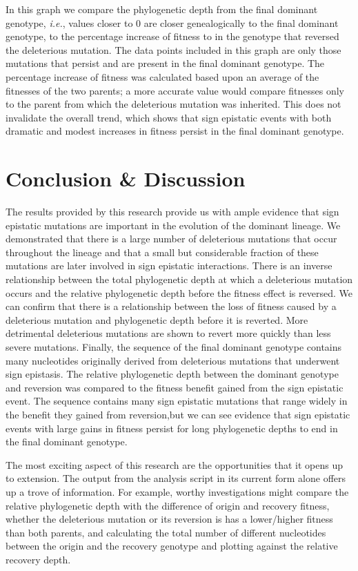 \documentclass[a4paper, 10pt]{article}
\begin{document}
In this graph we compare the phylogenetic depth from the final dominant genotype, {\em i.e.}, values closer to 0 are closer genealogically to the final dominant genotype, to the percentage increase of fitness to in the genotype that reversed the deleterious mutation. The data points included in this graph are only those mutations that persist and are present in the final dominant genotype. The percentage increase of fitness was calculated based upon an average of the fitnesses of the two parents; a more accurate value would compare fitnesses only to the parent from which the deleterious mutation was inherited. This does not invalidate the overall trend, which shows that sign epistatic events with both dramatic and modest increases in fitness persist in the final dominant genotype.

\section{Conclusion \& Discussion}

The results provided by this research provide us with ample evidence that sign epistatic mutations are important in the evolution of the dominant lineage. We demonstrated that there is a large number of deleterious mutations that occur throughout the lineage and that a small but considerable fraction of these mutations are later involved in sign epistatic interactions. There is an inverse relationship between the total phylogenetic depth at which a deleterious mutation occurs and the relative phylogenetic depth before the fitness effect is reversed. We can confirm that there is a relationship between the loss of fitness caused by a deleterious mutation and phylogenetic depth before it is reverted. More detrimental deleterious mutations are shown to  revert more quickly than less severe mutations. Finally, the sequence of the final dominant genotype contains many nucleotides originally derived from deleterious mutations that underwent sign epistasis. The relative phylogenetic depth between the dominant genotype and reversion was compared to the fitness benefit gained from the sign epistatic event. The sequence contains many sign epistatic mutations that range widely in the benefit they gained from reversion,but we can see evidence that sign epistatic events with large gains in fitness persist for long phylogenetic depths to end in the final dominant genotype.

The most exciting aspect of this research are the opportunities that it opens up to extension. The output from the analysis script in its current form alone offers up a trove of information. For example, worthy investigations might compare the relative phylogenetic depth with the difference of origin and recovery fitness, whether the deleterious mutation or its reversion is has a lower/higher fitness than both parents, and calculating the total number of different nucleotides between the origin and the recovery genotype and plotting against the relative recovery depth. 
\end{document}
